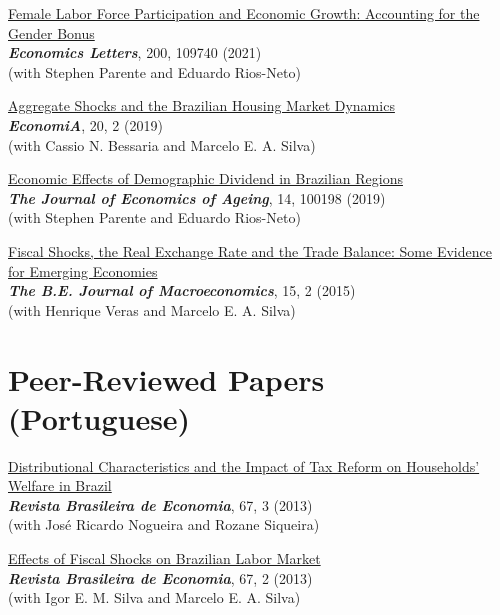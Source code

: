 \documentclass[mm, 10pt]{simple_style}
\begin{document}
\begin{resume}
\clearpage 
\href{https://doi.org/10.1016/j.econlet.2021.109740}{Female Labor Force Participation and Economic Growth: Accounting for the Gender Bonus}  \\
 \textbf{\textit{Economics Letters}}, 200, 109740 (2021)  \\ 
(with Stephen Parente and Eduardo Rios-Neto)

\href{https://doi.org/10.1016/j.econ.2019.08.001}{Aggregate Shocks and the Brazilian Housing Market Dynamics} \\
\textbf{\textit{EconomiA}}, 20, 2 (2019) \\
(with Cassio N. Bessaria and Marcelo E. A. Silva)

\href{https://doi.org/10.1016/j.jeoa.2019.100198}{Economic Effects of Demographic Dividend in Brazilian Regions} \\
\textbf{\textit{The Journal of Economics of Ageing}}, 14, 100198 (2019)  \\
(with Stephen Parente and Eduardo Rios-Neto)

\href{https://doi.org/10.1515/bejm-2014-0018}{Fiscal Shocks, the Real Exchange Rate and the Trade Balance: Some Evidence for Emerging Economies} \\
\textbf{\textit{The B.E. Journal of Macroeconomics}}, 15, 2 (2015)  \\
(with Henrique Veras and Marcelo E. A. Silva)


\section{Peer-Reviewed Papers\\ (Portuguese)}

\href{http://bibliotecadigital.fgv.br/ojs/index.php/rbe/article/view/6159}{Distributional Characteristics and the Impact of Tax Reform on Households’ Welfare in Brazil}  \\
\textbf{\textit{Revista Brasileira de Economia}}, 67, 3 (2013) \\
(with Jos\'e Ricardo Nogueira and Rozane Siqueira) 


\href{http://bibliotecadigital.fgv.br/ojs/index.php/rbe/article/view/3890}{Effects of Fiscal Shocks on Brazilian Labor Market} \\
\textbf{\textit{Revista Brasileira de Economia}}, 67, 2 (2013) \\
(with Igor E. M. Silva and Marcelo E. A. Silva) 


\end{resume}
\end{document}
